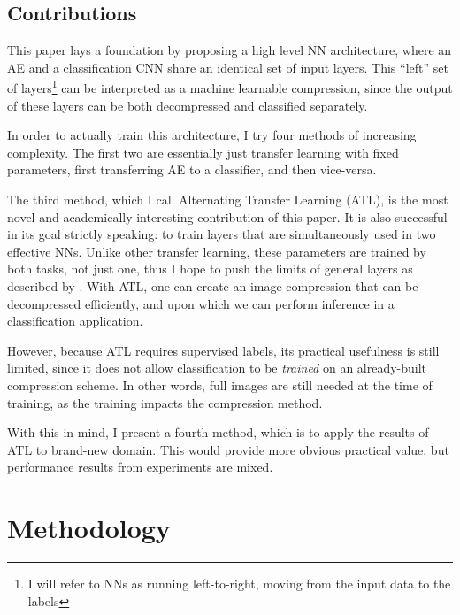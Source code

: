 \documentclass[twoside,11pt]{article}
\begin{document}
\subsection{Contributions}

This paper lays a foundation by proposing
a high level NN architecture, where an AE and a classification CNN
share an identical set of input layers. This ``left'' set of layers\footnote{I 
will refer to NNs as running 
left-to-right, moving from the input data to the labels}
can be interpreted as a machine learnable compression, since the output of these
layers can be both decompressed and classified separately. 

In order to actually train this architecture, I try four methods of increasing complexity.
The first two are essentially just transfer learning with fixed parameters, first
transferring AE to a classifier, and then vice-versa.

The third method, which I call Alternating Transfer Learning (ATL), is the most novel 
and academically interesting contribution of this paper.
It is also successful in its goal strictly speaking: to train layers 
that are simultaneously used in two effective NNs. Unlike other transfer learning,
these parameters are trained by both tasks, not just one,
thus I hope to push the limits of general layers as described by \cite{yosinski2014transferable}.
With ATL, one can create an image compression
that can be decompressed efficiently, and upon which we can perform inference in a 
classification application. 

However, because ATL requires supervised labels, its practical usefulness is still limited,
since it does not allow classification to be \emph{trained} on an already-built compression scheme.
In other words, full images are still needed at the time of training, as the training 
impacts the compression method. 

With this in mind, I present a fourth method, which is to apply the results of ATL to brand-new
domain. This would provide more obvious practical value, but performance results 
from experiments are mixed.







\section{Methodology} \label{fixed}
\end{document}
